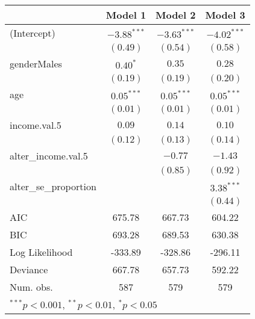 \begin{table}
\begin{tabular}{l c c c }
\hline
 & Model 1 & Model 2 & Model 3 \\
\hline
(Intercept)           & $-3.88^{***}$ & $-3.63^{***}$ & $-4.02^{***}$ \\
                      & $(0.49)$      & $(0.54)$      & $(0.58)$      \\
genderMales           & $0.40^{*}$    & $0.35$        & $0.28$        \\
                      & $(0.19)$      & $(0.19)$      & $(0.20)$      \\
age                   & $0.05^{***}$  & $0.05^{***}$  & $0.05^{***}$  \\
                      & $(0.01)$      & $(0.01)$      & $(0.01)$      \\
income.val.5          & $0.09$        & $0.14$        & $0.10$        \\
                      & $(0.12)$      & $(0.13)$      & $(0.14)$      \\
alter\_income.val.5   &               & $-0.77$       & $-1.43$       \\
                      &               & $(0.85)$      & $(0.92)$      \\
alter\_se\_proportion &               &               & $3.38^{***}$  \\
                      &               &               & $(0.44)$      \\
\hline
AIC                   & 675.78        & 667.73        & 604.22        \\
BIC                   & 693.28        & 689.53        & 630.38        \\
Log Likelihood        & -333.89       & -328.86       & -296.11       \\
Deviance              & 667.78        & 657.73        & 592.22        \\
Num. obs.             & 587           & 579           & 579           \\
\hline
\multicolumn{4}{l}{\scriptsize{$^{***}p<0.001$, $^{**}p<0.01$, $^*p<0.05$}}
\end{tabular}
\end{table}
